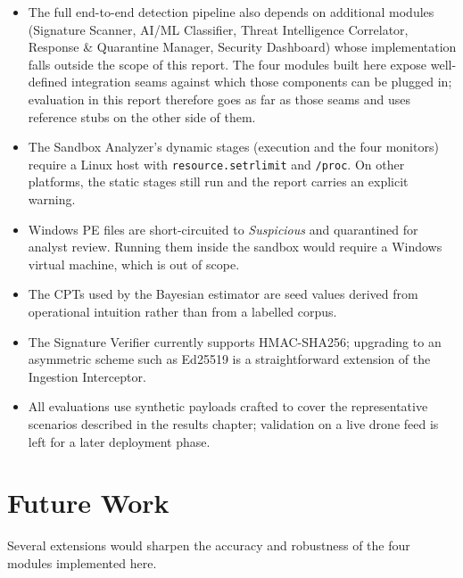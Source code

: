 \documentclass[12pt, a4paper]{report}
\begin{document}
\begin{itemize}
    \item The full end-to-end detection pipeline also depends on
          additional modules (Signature Scanner, AI/ML Classifier,
          Threat Intelligence Correlator, Response \& Quarantine
          Manager, Security Dashboard) whose implementation falls
          outside the scope of this report. The four modules built
          here expose well-defined integration seams against which
          those components can be plugged in; evaluation in this
          report therefore goes as far as those seams and uses
          reference stubs on the other side of them.
    \item The Sandbox Analyzer's dynamic stages (execution and the
          four monitors) require a Linux host with
          \texttt{resource.setrlimit} and \texttt{/proc}. On other
          platforms, the static stages still run and the report
          carries an explicit warning.
    \item Windows PE files are short-circuited to \emph{Suspicious}
          and quarantined for analyst review. Running them inside the
          sandbox would require a Windows virtual machine, which is
          out of scope.
    \item The CPTs used by the Bayesian estimator are seed values
          derived from operational intuition rather than from a
          labelled corpus.
    \item The Signature Verifier currently supports HMAC-SHA256;
          upgrading to an asymmetric scheme such as Ed25519 is a
          straightforward extension of the Ingestion Interceptor.
    \item All evaluations use synthetic payloads crafted to cover the
          representative scenarios described in the results chapter;
          validation on a live drone feed is left for a later
          deployment phase.
\end{itemize}

\section{Future Work}

Several extensions would sharpen the accuracy and robustness of the
four modules implemented here.
\end{document}
